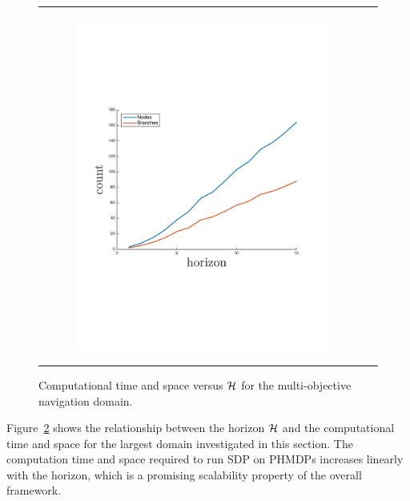 \begin{figure}[ht]
\begin{tabular}{cc}
            \begin{subfigure}[b]{0.24\textwidth}\centering \includegraphics[width=\textwidth]{images/space_plot_new}
                \label{fig:space_complexity}\end{subfigure}
            \\
        \end{tabular}
        \caption{Computational time and space versus {\footnotesize $ \mathcal{H} $} for the multi-objective navigation domain.}
        \label{fig:time_space_complexity}    
        \vspace{-3mm}
    \end{figure}

Figure~\ref{fig:time_space_complexity} shows the relationship between the horizon {\footnotesize $ \mathcal{H} $} and the computational time and space for the largest domain investigated in this section. The computation time and space required to run SDP on PHMDPs increases linearly with the horizon, which is a promising scalability property of the overall framework.